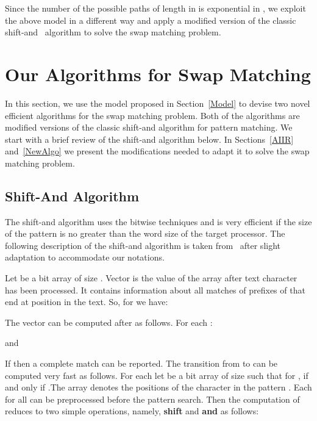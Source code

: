 \documentclass{llncs}
\begin{document}
Since the number of the possible paths of length  in  is exponential in , we exploit the above model in a different way and apply a modified version of the classic shift-and~\cite{BG92} algorithm to solve the swap matching problem.



















\section{\label{Algo}Our Algorithms for Swap Matching}
In this section, we use the model proposed in Section~\ref{Model} to devise two novel efficient algorithms for the swap matching problem. Both of the algorithms are modified versions of the classic shift-and algorithm for pattern matching. We start with a brief review of the shift-and algorithm below. In Sections~\ref{AIIR} and~\ref{NewAlgo} we present the modifications needed to adapt it to solve the swap matching problem.


\subsection{\label{shift-and}Shift-And Algorithm}
The shift-and algorithm uses the bitwise techniques and is very
efficient if the size of the pattern is no greater than the word
size of the target processor. The following description of the
shift-and algorithm is taken from~\cite{CharrasL04} after slight
adaptation to accommodate our notations.

Let  be a bit array of size . Vector  is the value of the
array  after text character  has been processed. It contains
information about all matches of prefixes of  that end at
position  in the text. So, for  we have:


The vector  can be computed after  as follows. For
each :


and



If  then a complete match can be reported. The transition from  to  can be computed very fast as
follows. For each  let  be a bit array of size 
such that for ,  if and only if .The
array  denotes the positions of the character  in the
pattern . Each  for all  can be preprocessed
before the pattern search. Then the computation of  reduces
to two simple operations, namely, \textbf{shift} and \textbf{and} as follows: 
\end{document}
